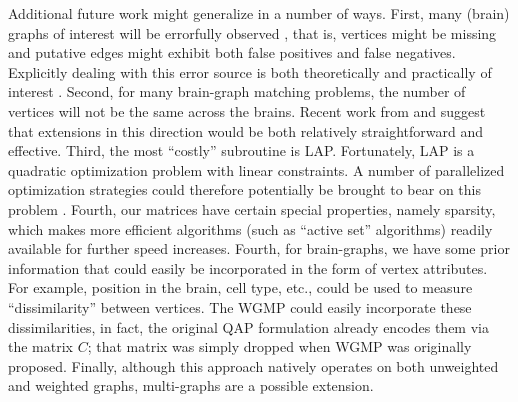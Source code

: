 \documentclass[10pt,journal,cspaper,compsoc]{IEEEtran}
\begin{document}

Additional future work might generalize \faqap in a number of ways.  First, many (brain) graphs of interest will be errorfully observed \cite{Priebe2011}, that is, vertices might be missing and putative edges might exhibit both false positives and false negatives.  Explicitly dealing with this error source is both theoretically and practically of interest \cite{VP11_unlabeled}.  
Second, for many brain-graph matching problems, the number of vertices will not be the same across the brains.  Recent work from \cite{Zaslavskiy2009, Zaslavskiy2010} and \cite{Escolano2011} suggest that extensions in this direction would be both relatively straightforward and effective. Third, the most ``costly'' subroutine is LAP.  Fortunately, LAP is a quadratic optimization problem with linear constraints.  A number of parallelized optimization strategies could therefore potentially be brought to bear on this problem \cite{Boyd2011}.  Fourth, our matrices have certain special properties, namely sparsity, which makes more efficient algorithms (such as ``active set'' algorithms) readily available for further speed increases.  Fourth, for brain-graphs, we have some prior information that could easily be incorporated in the form of vertex attributes.  For example, position in the brain, cell type, etc., could be used to measure ``dissimilarity'' between vertices.  The WGMP could easily incorporate these dissimilarities, in fact, the original QAP formulation already encodes them via the matrix $C$; that matrix was simply dropped when WGMP was originally proposed.  
Finally, although this approach natively operates on both unweighted and weighted graphs, multi-graphs are a possible extension.
\end{document}
